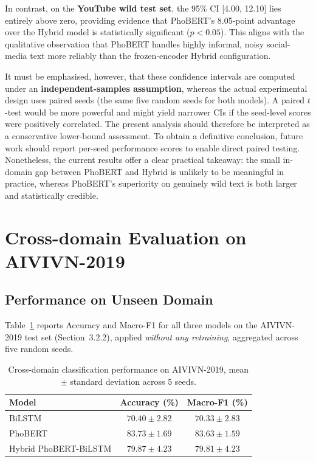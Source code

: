 \documentclass[12pt]{report} %
\begin{document}
In contrast, on the \textbf{YouTube wild test set}, the 95\% CI {[}4.00, 12.10{]} lies entirely above zero, providing evidence that PhoBERT's 8.05-point advantage over the Hybrid model is statistically significant (\(p < 0.05\)). This aligns with the qualitative observation that PhoBERT handles highly informal, noisy social-media text more reliably than the frozen-encoder Hybrid configuration.

It must be emphasised, however, that these confidence intervals are computed under an \textbf{independent-samples assumption}, whereas the actual experimental design uses paired seeds (the same five random seeds for both models). A paired \(t\)-test would be more powerful and might yield narrower CIs if the seed-level scores were positively correlated. The present analysis should therefore be interpreted as a conservative lower-bound assessment. To obtain a definitive conclusion, future work should report per-seed performance scores to enable direct paired testing. Nonetheless, the current results offer a clear practical takeaway: the small in-domain gap between PhoBERT and Hybrid is unlikely to be meaningful in practice, whereas PhoBERT's superiority on genuinely wild text is both larger and statistically credible.


\section{Cross-domain Evaluation on AIVIVN-2019}

\subsection{Performance on Unseen Domain}
Table~\ref{tab:aivivn-results} reports Accuracy and Macro-F1 for all three models on the AIVIVN-2019 test set (Section~3.2.2), applied \textit{without any retraining}, aggregated across five random seeds.

\begin{table}[htbp]
    \centering
    \caption{Cross-domain classification performance on AIVIVN-2019, mean $\pm$ standard deviation across 5 seeds.}
    \label{tab:aivivn-results}
    \begin{tabular}{lcc}
        \hline
        \textbf{Model}        & \textbf{Accuracy (\%)}    & \textbf{Macro-F1 (\%)}    \\
        \hline
        BiLSTM                & $70.40 \pm 2.82$          & $70.33 \pm 2.83$          \\
        PhoBERT               & $\mathbf{83.73 \pm 1.69}$ & $\mathbf{83.63 \pm 1.59}$ \\
        Hybrid PhoBERT-BiLSTM & $79.87 \pm 4.23$          & $79.81 \pm 4.23$          \\
        \hline
    \end{tabular}
\end{table}
\end{document}
